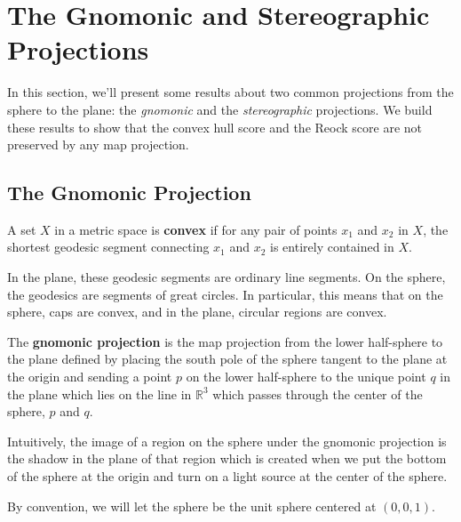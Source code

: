 \section{The Gnomonic and Stereographic Projections}\label{sec:gnom_stereo}
In this section, we'll present some results about two common
projections from the sphere to the plane: the \textit{gnomonic} and
the \textit{stereographic} projections.  We build these results to
show that the convex hull score and the Reock score are not preserved
by any map projection.

\subsection{The Gnomonic Projection}


\begin{definition}
	A set $X$ in a metric space is \textbf{convex} if for any pair of
	points $x_1$ and $x_2$ in $X$, the shortest geodesic segment
	connecting $x_1$ and $x_2$ is entirely contained in $X$. 
\end{definition}
In the plane, these geodesic segments are ordinary line segments.  On
the sphere, the geodesics are segments of great circles. In 
particular, this means that on the sphere, caps are 
convex, and in the plane, circular regions are convex.


\begin{definition}
	The \textbf{gnomonic projection} is the map projection from the
	lower half-sphere to the plane defined by placing the south pole of
	the sphere tangent to the plane at the origin and sending a point
	$p$ on the lower half-sphere to the unique point $q$ in the plane
	which lies on the line in $\mathbb{R}^3$ which passes through the
	center of the sphere, $p$ and $q$.
\end{definition}
Intuitively, the image of a region on the sphere under the gnomonic
projection is the shadow in the plane of that region which is
created when we put the bottom of the sphere at the origin and turn
on a light source at the center of the sphere.

By convention, we will let the sphere be the unit sphere 
centered at $(0,0,1)$.

